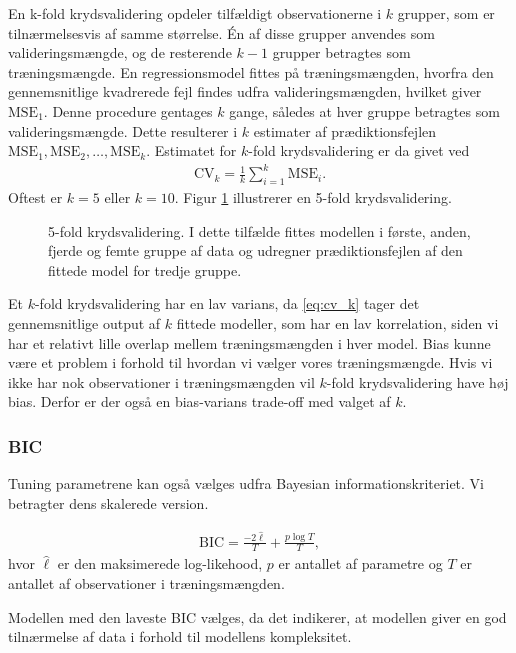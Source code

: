 En k-fold krydsvalidering opdeler tilfældigt observationerne i \(k\) grupper, som er tilnærmelsesvis af samme størrelse.
Én af disse grupper anvendes som valideringsmængde, og de resterende \(k-1\) grupper betragtes som træningsmængde.
En regressionsmodel fittes på træningsmængden, hvorfra den gennemsnitlige kvadrerede fejl findes udfra valideringsmængden, hvilket giver \(\text{MSE}_1\).
Denne procedure gentages \(k\) gange, således at hver gruppe betragtes som valideringsmængde.
Dette resulterer i \(k\) estimater af prædiktionsfejlen $\text{MSE}_1, \text{MSE}_2, \dots , \text{MSE}_k$.
Estimatet for \(k\)-fold krydsvalidering er da givet ved
\begin{align}
\text{CV}_k = \frac{1}{k} \sum_{i=1}^k \text{MSE}_i. \label{eq:cv_k}
\end{align}
Oftest er $k=5$ eller $k = 10$. 
Figur \ref{fig:cv_teori} illustrerer en 5-fold krydsvalidering. 
%
\begin{figure}
\center
\scalebox{0.6}{}
\caption{5-fold krydsvalidering. I dette tilfælde fittes modellen i første, anden, fjerde og femte gruppe af data og udregner prædiktionsfejlen af den fittede model for tredje gruppe.} \label{fig:cv_teori}
\end{figure} 
%
Et $k$-fold krydsvalidering har en lav varians, da \eqref{eq:cv_k} tager det gennemsnitlige output af $k$ fittede modeller, som har en lav korrelation, siden vi har et relativt lille overlap mellem træningsmængden i hver model. 
Bias kunne være et problem i forhold til hvordan vi vælger vores træningsmængde. Hvis vi ikke har nok observationer i træningsmængden vil $k$-fold krydsvalidering have høj bias. Derfor er der også en bias-varians trade-off med valget af $k$. 

\subsubsection{BIC}
Tuning parametrene kan også vælges udfra Bayesian informationskriteriet.
Vi betragter dens skalerede version.
%
\begin{defn} \label{def:bic}
\begin{align*}
\text{BIC} =  \frac{- 2 \widehat{\ell}}{T} + \frac{p \log T}{T}, 
\end{align*}
hvor \(\widehat{\ell}\) er den maksimerede log-likehood, \(p\) er antallet af parametre og \(T\) er antallet af observationer i træningsmængden.
\end{defn} 
%
Modellen med den laveste BIC vælges, da det indikerer, at modellen giver en god tilnærmelse af data i forhold til modellens kompleksitet. 

